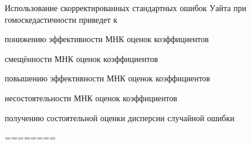 
\begin{question}
Использование скорректированных стандартных ошибок Уайта при
гомоскедастичности приведет к
\begin{answerlist}
  \item понижению эффективности МНК оценок коэффициентов
  \item смещённости МНК оценок коэффициентов
  \item повышению эффективности МНК оценок коэффициентов
  \item несостоятельности МНК оценок коэффициентов
  \item получению состоятельной оценки дисперсии случайной ошибки
\end{answerlist}
\end{question}

\begin{solution}
========
\end{solution}

